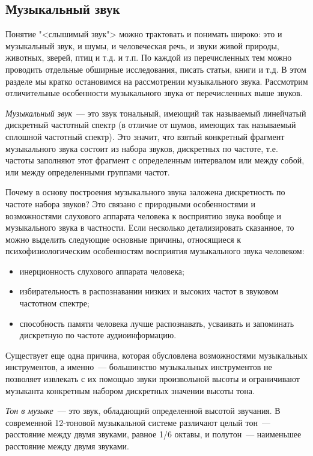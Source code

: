 \documentclass[oneside, final, 14pt]{extreport}
\begin{document}
\subsection{Музыкальный звук}
Понятие "<слышимый звук"> можно трактовать и понимать широко: это и музыкальный звук, и шумы, и человеческая речь, и звуки живой природы, животных, зверей, птиц и т.д. и т.п. По каждой из перечисленных тем можно проводить отдельные обширные исследования, писать статьи, книги и т.д. В этом разделе мы кратко остановимся на рассмотрении музыкального звука. Рассмотрим отличительные особенности музыкального звука от перечисленных выше звуков. 

{\itshape Музыкальный звук}~--- это звук тональный, имеющий так называемый линейчатый дискретный частотный спектр (в отличие от шумов, имеющих так называемый сплошной частотный спектр). Это значит, что взятый конкретный фрагмент музыкального звука состоит из набора звуков, дискретных по частоте, т.е. частоты заполняют этот фрагмент с определенным интервалом или между собой, или между определенными группами частот. 

Почему в основу построения музыкального звука заложена дискретность по частоте набора звуков?  Это связано с природными особенностями и возможностями слухового аппарата человека к восприятию звука вообще и музыкального звука в частности. Если несколько детализировать сказанное, то можно
выделить следующие основные причины, относящиеся к психофизиологическим
особенностям восприятия музыкального звука человеком: 
\begin{itemize}
\item инерционность слухового аппарата человека;
\item избирательность в распознавании низких и высоких частот в звуковом частотном спектре;
\item способность памяти человека лучше распознавать, усваивать и запоминать дискретную по частоте аудиоинформацию.
\end{itemize}

Существует еще одна причина, которая обусловлена возможностями музыкальных инструментов, а именно~--- большинство музыкальных инструментов не позволяет извлекать с их помощью звуки произвольной высоты и ограничивают музыканта 
конкретным набором дискретных значении высоты тона.

{\itshape Тон в музыке}~--- это звук, обладающий определенной высотой звучания. В современной 12-тоновой музыкальной системе различают целый тон~--- расстояние между двумя звуками, равное 1/6 октавы, и полутон~--- наименьшее расстояние между двумя звуками.
\end{document}
